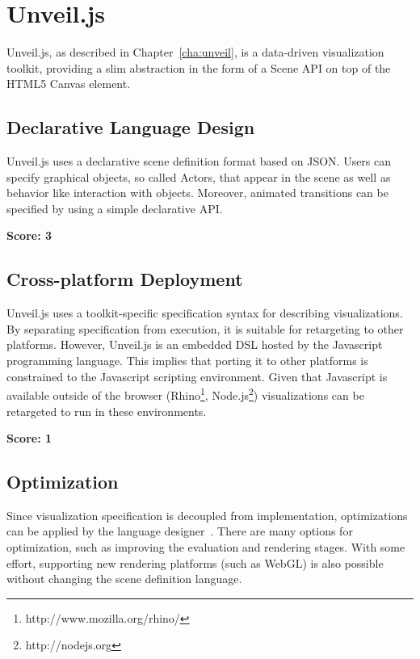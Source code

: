 \section{Unveil.js}

Unveil.js, as described in Chapter~\ref{cha:unveil}, is a data-driven visualization toolkit, providing a slim abstraction in the form of a Scene API on top of the HTML5 Canvas element.

\subsection{Declarative Language Design}

Unveil.js uses a declarative scene definition format based on JSON. Users can specify graphical objects, so called Actors, that appear in the scene as well as behavior like interaction with objects. Moreover, animated transitions can be specified by using a simple declarative API.

\SuperPar \textbf{Score: 3}

\subsection{Cross-platform Deployment}

Unveil.js uses a toolkit-specific specification syntax for describing visualizations. By separating specification from execution, it is suitable for retargeting to other platforms. However, Unveil.js is an embedded DSL hosted by the Javascript programming language. This implies that porting it to other platforms is constrained to the Javascript scripting environment. Given that Javascript is available outside of the browser (Rhino\footnote{http://www.mozilla.org/rhino/}, Node.js\footnote{http://nodejs.org}) visualizations can be retargeted to run in these environments.


\SuperPar \textbf{Score: 1}


\subsection{Optimization}

Since visualization specification is decoupled from implementation, optimizations can be applied by the language designer~\cite{DeclarativeLD10}. There are many options for optimization, such as improving the evaluation and rendering stages. With some effort, supporting new rendering platforms (such as WebGL) is also possible without changing the scene definition language.

